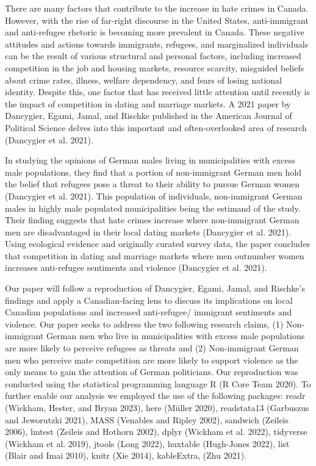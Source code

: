 \documentclass[
]{article}
\begin{document}
There are many factors that contribute to the increase in hate crimes in
Canada. However, with the rise of far-right discourse in the United
States, anti-immigrant and anti-refugee rhetoric is becoming more
prevalent in Canada. These negative attitudes and actions towards
immigrants, refugees, and marginalized individuals can be the result of
various structural and personal factors, including increased competition
in the job and housing markets, resource scarcity, misguided beliefs
about crime rates, illness, welfare dependency, and fears of losing
national identity. Despite this, one factor that has received little
attention until recently is the impact of competition in dating and
marriage markets. A 2021 paper by Dancygier, Egami, Jamal, and Rischke
published in the American Journal of Political Science delves into this
important and often-overlooked area of research (Dancygier et al. 2021).

In studying the opinions of German males living in municipalities with
excess male populations, they find that a portion of non-immigrant
German men hold the belief that refugees pose a threat to their ability
to pursue German women (Dancygier et al. 2021). This population of
individuals, non-immigrant German males in highly male populated
municipalities being the estimand of the study. Their finding suggests
that hate crimes increase where non-immigrant German men are
disadvantaged in their local dating markets (Dancygier et al. 2021).
Using ecological evidence and originally curated survey data, the paper
concludes that competition in dating and marriage markets where men
outnumber women increases anti-refugee sentiments and violence
(Dancygier et al. 2021).

Our paper will follow a reproduction of Dancygier, Egami, Jamal, and
Rischke's findings and apply a Canadian-facing lens to discuss its
implications on local Canadian populations and increased anti-refugee/
immigrant sentiments and violence. Our paper seeks to address the two
following research claims, (1) Non-immigrant German men who live in
municipalities with excess male populations are more likely to perceive
refugees as threats and (2) Non-immigrant German men who perceive mate
competition are more likely to support violence as the only means to
gain the attention of German politicians. Our reproduction was conducted
using the statistical programming language R (R Core Team 2020). To
further enable our analysis we employed the use of the following
packages: readr (Wickham, Hester, and Bryan 2023), here (Müller 2020),
readstata13 (Garbuszus and Jeworutzki 2021), MASS (Venables and Ripley
2002), sandwich (Zeileis 2006), lmtest (Zeileis and Hothorn 2002), dplyr
(Wickham et al. 2022), tidyverse (Wickham et al. 2019), jtools (Long
2022), huxtable (Hugh-Jones 2022), list (Blair and Imai 2010), knitr
(Xie 2014), kableExtra, (Zhu 2021).
\end{document}
